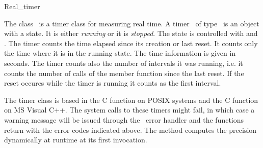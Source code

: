 
\begin{ccRefClass}{Real_timer}

\ccDefinition


The class \ccRefName\ is a timer class for measuring real time.
A timer \ccVar\ of type \ccRefName\ is an object with a state. It is
either {\em running\/} or it is {\em stopped}. The state is controlled
with  and . The timer counts the
time elapsed since its creation or last reset. It counts only the time
where it is in the running state. The time information is given in seconds.
The timer counts also the number of intervals it was running, i.e. it 
counts the number of calls of the  member function since the 
last reset. If the reset occures while the timer is running it counts as the
first interval.

\ccCreation

\ccPropagateThreeToTwoColumns


\ccOperations

\ccGlue
{}
\ccGlue
{}
\ccGlue
{}

\ccGlue
{} 
\ccGlue
{}
\ccGlue
{}

\ccImplementation


The timer class is based in the C function  on
POSIX systems and the C function  on MS Visual C++.
The system calls to these
timers might fail, in which case a warning message will be issued
through the \cgal\ error handler and the functions return with the
error codes indicated above.  The  method computes the
precision dynamically at runtime at its first invocation.


\end{ccRefClass}
